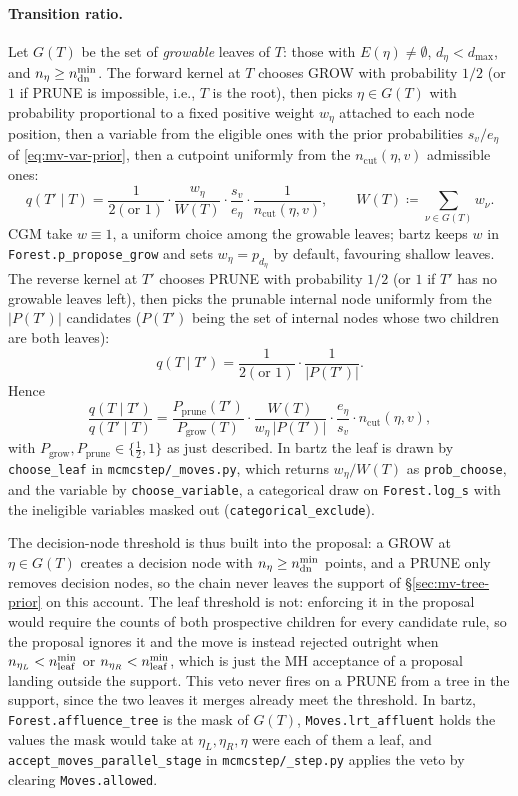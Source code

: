 \paragraph{Transition ratio.}
Let $G(T)$ be the set of \emph{growable} leaves of $T$: those with
$E(\eta) \ne \emptyset$, $d_\eta < d_{\max}$, and $n_\eta \ge n^{\min}_{\mathrm{dn}}$. The
forward kernel at $T$
chooses GROW with probability $1/2$ (or $1$ if PRUNE is impossible, i.e.,
$T$ is the root), then picks $\eta \in G(T)$ with probability proportional
to a fixed positive weight $w_\eta$ attached to each node position, then a
variable from the eligible ones with the prior probabilities $s_v / e_\eta$
of \eqref{eq:mv-var-prior}, then a cutpoint uniformly from the
$n_{\mathrm{cut}}(\eta, v)$ admissible ones:
\[
	q(T' \mid T) = \frac{1}{2(\text{or }1)} \cdot
	\frac{w_\eta}{W(T)} \cdot
	\frac{s_v}{e_\eta} \cdot
	\frac{1}{n_{\mathrm{cut}}(\eta, v)},
	\qquad
	W(T) \coloneqq \sum_{\nu \in G(T)} w_\nu.
\]
CGM take $w \equiv 1$, a uniform choice among the growable leaves; bartz
keeps $w$ in \texttt{Forest.p\_propose\_grow} and sets $w_\eta = p_{d_\eta}$
by default, favouring shallow leaves. The reverse kernel at $T'$ chooses
PRUNE with probability $1/2$ (or $1$ if $T'$ has no growable leaves left),
then picks the prunable internal node uniformly from the $|P(T')|$
candidates ($P(T')$ being the set of internal nodes whose two children are
both leaves):
\[
	q(T \mid T') = \frac{1}{2(\text{or }1)} \cdot \frac{1}{|P(T')|}.
\]
Hence
\begin{equation}
	\label{eq:mv-trans-ratio-grow}
	\frac{q(T \mid T')}{q(T' \mid T)}
	= \frac{P_{\mathrm{prune}}(T')}{P_{\mathrm{grow}}(T)} \cdot
	\frac{W(T)}{w_\eta\,|P(T')|} \cdot
	\frac{e_\eta}{s_v} \cdot n_{\mathrm{cut}}(\eta, v),
\end{equation}
with $P_{\mathrm{grow}}, P_{\mathrm{prune}} \in \{\frac{1}{2}, 1\}$ as just
described. In bartz the leaf is drawn by \texttt{choose\_leaf} in
\texttt{mcmcstep/\_moves.py}, which returns $w_\eta / W(T)$ as
\texttt{prob\_choose}, and the variable by \texttt{choose\_variable}, a
categorical draw on \texttt{Forest.log\_s} with the ineligible variables
masked out (\texttt{categorical\_exclude}).

The decision-node threshold is thus built into the proposal: a GROW at
$\eta \in G(T)$ creates a decision node with $n_\eta \ge n^{\min}_{\mathrm{dn}}$ points, and
a PRUNE only removes decision nodes, so the chain never leaves the support
of \S\ref{sec:mv-tree-prior} on this account. The leaf threshold is not:
enforcing it in the proposal would require the counts of both prospective
children for every candidate rule, so the proposal ignores it and the move
is instead rejected outright when $n_{\eta_L} < n^{\min}_{\mathrm{leaf}}$ or
$n_{\eta_R} < n^{\min}_{\mathrm{leaf}}$, which is just the MH acceptance of a proposal
landing outside the support. This veto never fires on a PRUNE from a tree in
the support, since the two leaves it merges already meet the threshold. In
bartz, \texttt{Forest.affluence\_tree} is the mask of $G(T)$,
\texttt{Moves.lrt\_affluent} holds the values the mask would take at
$\eta_L, \eta_R, \eta$ were each of them a leaf, and
\texttt{accept\_moves\_parallel\_stage} in \texttt{mcmcstep/\_step.py}
applies the veto by clearing \texttt{Moves.allowed}.

